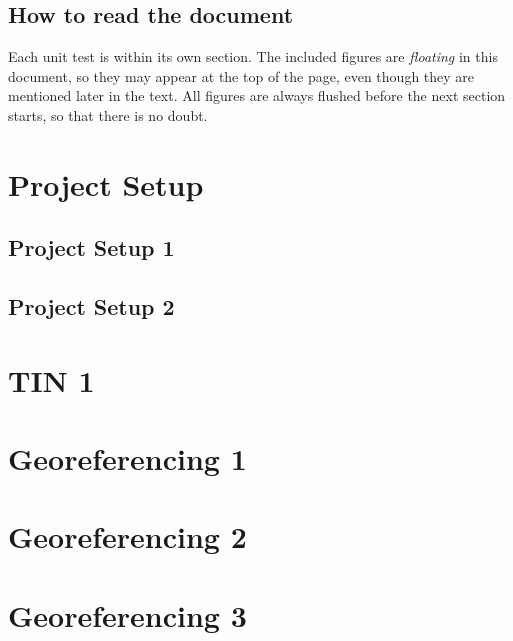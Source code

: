 \documentclass{scrartcl}
\begin{document}
\subsection{How to read the document}

Each unit test is within its own section.
The included figures are \emph{floating} in this document, so they may appear at the top of the page,
 even though they are mentioned later in the text.
All figures are always flushed before the next section starts, so that there is no doubt.

\tableofcontents
\clearpage

\section{Project Setup}

\subsection{Project Setup 1}
\label{sec:project_setup_1}
\clearpage

\subsection{Project Setup 2}
\label{sec:project_setup_2}
\clearpage


\section{TIN 1}
\label{sec:tin_1}
\clearpage

\section{Georeferencing 1}
\label{sec:georeferencing_1}
\clearpage

\section{Georeferencing 2}
\label{sec:georeferencing_2}
\clearpage

\section{Georeferencing 3}
\label{sec:georeferencing_3}
\clearpage
\end{document}
